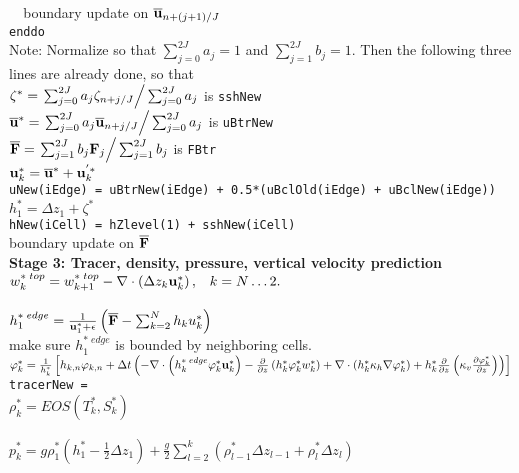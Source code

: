 \documentclass[11pt]{report}
\begin{document}
\verb|  |boundary update on $\overline{\bf u}_{n+(j+1)/J}$\\

\verb|enddo|\\
Note: Normalize so that $\sum_{j=0}^{2J} a_j=1$ and $\sum_{j=1}^{2J} b_j=1$.  Then the following 
three lines are already done, so that\\
$\zeta^* = \left. \sum_{j=0}^{2J} a_j \zeta_{n+j/J} \right/ \sum_{j=0}^{2J} a_j$ is \verb|sshNew|\\
$\overline{\bf u}^* = \left. \sum_{j=0}^{2J} a_j \overline{\bf u}_{n+j/J} \right/ \sum_{j=0}^{2J} a_j $ is \verb|uBtrNew|\\
${\overline {\bf F}} = \left. \sum_{j=1}^{2J} b_j {\bf F}_j \right/ \sum_{j=1}^{2J} b_j$ is \verb|FBtr|\\
\verb||${\bf u}^*_k = \overline{\bf u}^* + {\bf u}^{'*}_k $\\
\verb|uNew(iEdge) = uBtrNew(iEdge) + 0.5*(uBclOld(iEdge) + uBclNew(iEdge))|\\
\verb||$h_1^* = \Delta z_1 + \zeta^*$\\
\verb|hNew(iCell) = hZlevel(1) + sshNew(iCell)|\\

boundary update on ${\overline {\bf F}}$\\


{\bf Stage 3: Tracer, density, pressure, vertical velocity prediction} \\
$w^{*\; top}_k 
= w^{*\; top}_{k+1} 
- \nabla \cdot \left( \Delta z_k {\bf u}^*_k \right), \;\;\; k=N\ldots 2.$\\
\verb|  |\\
$h^{*\; edge}_1 = \frac{1}{{\bf u}^*_1 + \epsilon}
\left({\overline {\bf F}} - \sum_{k=2}^N h_k u_k^* \right)$\\
make sure $h^{*\; edge}_1$ is bounded by neighboring cells.\\
${\varphi}_k^* = \frac{1}{h_k^*} \left[
h_{k,n} \varphi_{k,n} 
+ \Delta t
\left(  - \nabla \cdot \left( h_k^{*\; edge}\varphi_k^* {\bf u}_k^* \right)  
- \frac{\partial}{\partial z} \left( h_k^*\varphi_k^* w_k^* \right)  
+ \nabla\cdot\left(h_k^* \kappa_h \nabla\varphi_k^* \right)
+ h_k^* \frac{\partial }{\partial z} 
  \left( \kappa_v \frac{\partial \varphi_k^*}{\partial z} \right)
\right) \right]$\\
\verb|tracerNew = |\\
${\rho}_k^* = EOS(T^*_k, S^*_k) $\\
\verb|  |\\
${p}_k^* =   g {\rho}_1^* \left( h_1^* - \frac{1}{2}\Delta z_1 \right) + 
  \frac{g}{2}\sum_{l=2}^{k} 
\left({\rho}_{l-1}^* \Delta z_{l-1}
+ {\rho}_{l}^* \Delta z_{l} 
\right)$\\
\end{document}

